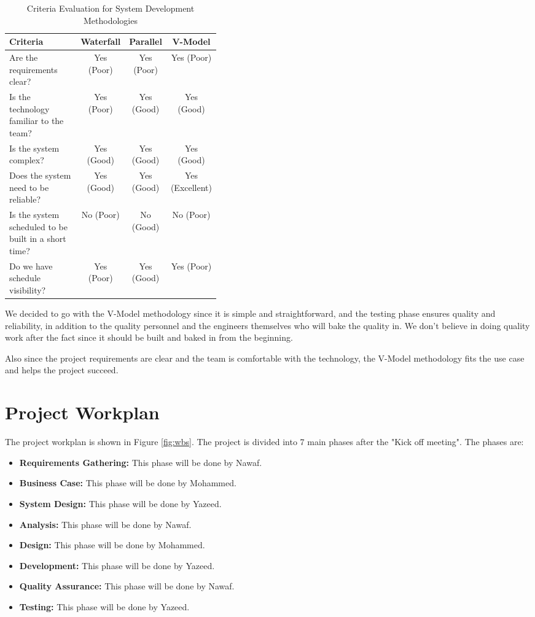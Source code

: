 \documentclass[a4paper]{report}
\begin{document}
\begin{table}[htbp]
    \centering
    \caption{Criteria Evaluation for System Development Methodologies}
    \label{tab:methodology-criteria}
    \begin{tabular}{@{}p{0.4\linewidth}ccc@{}}
        \toprule
        Criteria & Waterfall & Parallel & V-Model \\
        \midrule
        Are the requirements clear? & Yes (Poor) & Yes (Poor) & Yes (Poor) \\
        Is the technology familiar to the team? & Yes (Poor) & Yes (Good) & Yes (Good) \\
        Is the system complex? & Yes (Good) & Yes (Good) & Yes (Good) \\
        Does the system need to be reliable? & Yes (Good) & Yes (Good) & Yes (Excellent) \\
        Is the system scheduled to be built in a short time? & No (Poor) & No (Good) & No (Poor) \\
        Do we have schedule visibility? & Yes (Poor) & Yes (Good) & Yes (Poor) \\
        \bottomrule
    \end{tabular}
\end{table}

We decided to go with the V-Model methodology since it is simple and straightforward, and the testing phase ensures quality and reliability, in addition to the quality personnel and the engineers themselves who will bake the quality in. We don't believe in doing quality work after the fact since it should be built and baked in from the beginning.

Also since the project requirements are clear and the team is comfortable with the technology, the V-Model methodology fits the use case and helps the project succeed.

\chapter{Project Workplan}

The project workplan is shown in Figure \ref{fig:wbs}. The project is divided into 7 main phases after the "Kick off meeting". The phases are:

\begin{itemize}
    \item \textbf{Requirements Gathering:} This phase will be done by Nawaf.
    \item \textbf{Business Case:} This phase will be done by Mohammed.
    \item \textbf{System Design:} This phase will be done by Yazeed.
    \item \textbf{Analysis:} This phase will be done by Nawaf.
    \item \textbf{Design:} This phase will be done by Mohammed.
    \item \textbf{Development:} This phase will be done by Yazeed.
    \item \textbf{Quality Assurance:} This phase will be done by Nawaf.
    \item \textbf{Testing:} This phase will be done by Yazeed.
\end{itemize}
\end{document}
